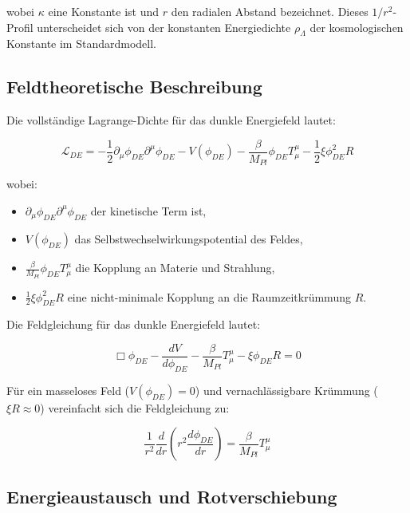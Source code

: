 \documentclass[a4paper,12pt]{article}
\begin{document}
	wobei $\kappa$ eine Konstante ist und $r$ den radialen Abstand bezeichnet. Dieses $1/r^2$-Profil unterscheidet sich von der konstanten Energiedichte $\rho_\Lambda$ der kosmologischen Konstante im Standardmodell.
	
	\subsection{Feldtheoretische Beschreibung}
	
	Die vollständige Lagrange-Dichte für das dunkle Energiefeld lautet:
	
	\begin{equation}
		\mathcal{L}_{DE} = -\frac{1}{2}\partial_\mu \phi_{DE} \partial^\mu \phi_{DE} - V(\phi_{DE}) - \frac{\beta}{M_{Pl}} \phi_{DE} T^{\mu}_{\mu} - \frac{1}{2}\xi \phi_{DE}^2 R
	\end{equation}
	
	wobei:
	\begin{itemize}
		\item $\partial_\mu \phi_{DE} \partial^\mu \phi_{DE}$ der kinetische Term ist,
		\item $V(\phi_{DE})$ das Selbstwechselwirkungspotential des Feldes,
		\item $\frac{\beta}{M_{Pl}} \phi_{DE} T^{\mu}_{\mu}$ die Kopplung an Materie und Strahlung,
		\item $\frac{1}{2}\xi \phi_{DE}^2 R$ eine nicht-minimale Kopplung an die Raumzeitkrümmung $R$.
	\end{itemize}
	
	Die Feldgleichung für das dunkle Energiefeld lautet:
	
	\begin{equation}
		\Box\phi_{DE} - \frac{dV}{d\phi_{DE}} - \frac{\beta}{M_{Pl}}T^{\mu}_{\mu} - \xi \phi_{DE} R = 0
	\end{equation}
	
	Für ein masseloses Feld ($V(\phi_{DE}) = 0$) und vernachlässigbare Krümmung ($\xi R \approx 0$) vereinfacht sich die Feldgleichung zu:
	
	\begin{equation}
		\frac{1}{r^2}\frac{d}{dr}\left(r^2\frac{d\phi_{DE}}{dr}\right) = \frac{\beta}{M_{Pl}}T^{\mu}_{\mu}
	\end{equation}
	
	\subsection{Energieaustausch und Rotverschiebung}
	
\end{document}
